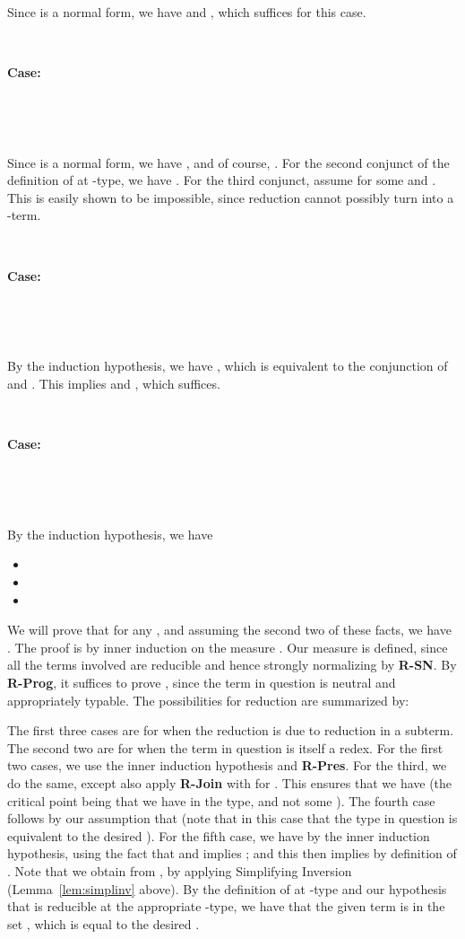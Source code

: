 \documentclass[copyright]{eptcs}
\begin{document}
\

\noindent Since  is a normal form, we have  and
, which suffices for this case.

\ 

\noindent \textbf{Case:}

\



\ 

\noindent Since  is a normal form, we have , and of
course, . For the
second conjunct of the definition of  at -type,
we have . For the third conjunct, assume
 for some  and .  This is easily
shown to be impossible, since reduction cannot possibly turn 
into a -term.

\ 

\noindent \textbf{Case:}

\



\ 

\noindent By the induction hypothesis, we have , which is equivalent to the conjunction of
 and .  This implies
 and , which
suffices.

\ 

\noindent \textbf{Case:}

\



\ 

\noindent By the induction hypothesis, we have
\begin{itemize}
\item 
\item 
\item 
\end{itemize}

\noindent We will prove that for any , and
assuming the second two of these facts, we have . The proof is
by inner induction on the measure .  Our measure is defined, since all the terms
involved are reducible and hence strongly normalizing by
\textbf{R-SN}.  By \textbf{R-Prog}, it suffices to prove
, since the term in question is
neutral and appropriately typable.  The possibilities for reduction are
summarized by:


\noindent The first three cases are for when the reduction is due to
reduction in a subterm.  The second two are for when the term in
question is itself a redex.  For the first two cases, we use the inner
induction hypothesis and \textbf{R-Pres}.  For the third, we do the
same, except also apply \textbf{R-Join} with  for
.  This ensures that we have  (the
critical point being that we have  in the type, and not some
).  The fourth case follows by our assumption that
 (note that in this case that
the type in question is equivalent to the desired ).  For
the fifth case, we have  by the inner induction
hypothesis, using the fact that  and  implies
; and this then implies  by
definition of .  Note that we obtain  from , by applying Simplifying
Inversion (Lemma~\ref{lem:simplinv} above).  By the definition of
 at -type and our hypothesis that  is
reducible at the appropriate -type, we have that the given term
is in the set , which is equal to the
desired .
\end{document}
